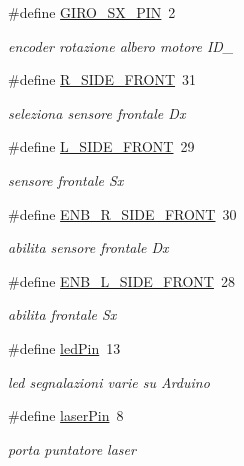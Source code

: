 \begin{DoxyCompactItemize}
\#define \mbox{\hyperlink{ari_pi__2_d_c__esp__08_8ino_ab1940449ba61cdf83d35a9dab25b039c}{G\+I\+R\+O\+\_\+\+S\+X\+\_\+\+P\+IN}}~2
\begin{DoxyCompactList}\small\item\em encoder rotazione albero motore I\+D\+\_ \end{DoxyCompactList}\item 
\#define \mbox{\hyperlink{ari_pi__2_d_c__esp__08_8ino_a3b5d438b9c0508db7c53e86daa265dc8}{R\+\_\+\+S\+I\+D\+E\+\_\+\+F\+R\+O\+NT}}~31
\begin{DoxyCompactList}\small\item\em seleziona sensore frontale Dx \end{DoxyCompactList}\item 
\#define \mbox{\hyperlink{ari_pi__2_d_c__esp__08_8ino_a531e2edff1884d356024e8764761ffaa}{L\+\_\+\+S\+I\+D\+E\+\_\+\+F\+R\+O\+NT}}~29
\begin{DoxyCompactList}\small\item\em sensore frontale Sx \end{DoxyCompactList}\item 
\#define \mbox{\hyperlink{ari_pi__2_d_c__esp__08_8ino_a551793442f7ac915171c5478f3df0955}{E\+N\+B\+\_\+\+R\+\_\+\+S\+I\+D\+E\+\_\+\+F\+R\+O\+NT}}~30
\begin{DoxyCompactList}\small\item\em abilita sensore frontale Dx \end{DoxyCompactList}\item 
\#define \mbox{\hyperlink{ari_pi__2_d_c__esp__08_8ino_a5709a7b011efe9859445cf4a2c0646ea}{E\+N\+B\+\_\+\+L\+\_\+\+S\+I\+D\+E\+\_\+\+F\+R\+O\+NT}}~28
\begin{DoxyCompactList}\small\item\em abilita frontale Sx \end{DoxyCompactList}\item 
\#define \mbox{\hyperlink{ari_pi__2_d_c__esp__08_8ino_a49ba715e713d99d1a5c20429dacaf073}{led\+Pin}}~13
\begin{DoxyCompactList}\small\item\em led segnalazioni varie su Arduino \end{DoxyCompactList}\item 
\#define \mbox{\hyperlink{ari_pi__2_d_c__esp__08_8ino_ad29f66110456ba86205034ad1232fca8}{laser\+Pin}}~8
\begin{DoxyCompactList}\small\item\em porta puntatore laser \end{DoxyCompactList}\item 

\end{DoxyCompactItemize}
